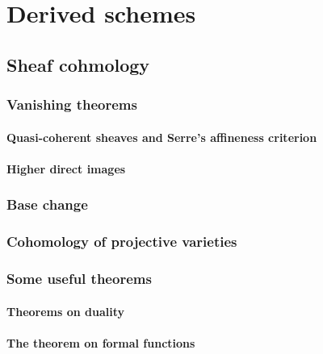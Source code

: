 \chapter{Derived schemes} \label{chapter: cohomology_and_derived_schemes}
    \begin{abstract}
        
    \end{abstract}
    
    \minitoc
    
    \section{Sheaf cohmology}
        \subsection{Vanishing theorems}
            \subsubsection{Quasi-coherent sheaves and Serre's affineness criterion}
            
            \subsubsection{Higher direct images}
        
        \subsection{Base change}
        
        \subsection{Cohomology of projective varieties}
        
        \subsection{Some useful theorems}
            \subsubsection{Theorems on duality}
            
            \subsubsection{The theorem on formal functions}
            
